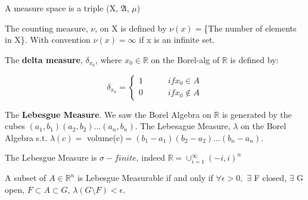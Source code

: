 \begin{leftbar}
\begin{define}
	A measure space is a triple (X, $\mathfrak{A}$, $\mu$) 
\end{define}
\end{leftbar}

\begin{ex}
	The counting measure, $\nu$, on X is defined by $\nu(x)=$\{The number of elements in X\}. With convention $\nu(x)=\infty$ if x is an infinite set.
\end{ex}

\begin{ex}
	The \textbf{delta measure}, $\delta_{x_{0}}$, where $x_{0}\in\mathbb{R}$ on the Borel-alg of $\mathbb{R}$ is defined by:
	
	\[
	\delta_{x_{0}} = \begin{cases}
					  1 \hspace{3em}if x_{0}\in A\\
					  0 \hspace{3em}if x_{0}\notin A
	\end{cases}
	\]
\end{ex}

\begin{ex}
	The \textbf{Lebesgue Measure}. We saw the Borel Algebra on $\mathbb{R}$ is generated by the cubes $(a_{1},b_{1})(a_{2},b_{2})\dots(a_{n},b_{n})$. The Lebesague Measure, $\lambda$ on the Borel Algebra s.t. $\lambda(c)=$ volume(c)$=(b_{1}-a_{1})(b_{2}-a_{2})\dots(b_{n}-a_{n})$.
\end{ex}

 The Lebesgue Measure is $\sigma-finite$, indeed $\mathbb{R}=\cup_{i=1}^{\infty}(-i,i)^{n}$

\begin{thm}
	A subset of $A\in\mathbb{R}^{n}$ is Lebesgue Measurable if and only if $\forall \epsilon > 0,$ $\exists$ F closed, $\exists$ G open, $F\subset A \subset G$, $\lambda(G\setminus F)<\epsilon$.
\end{thm}















































%